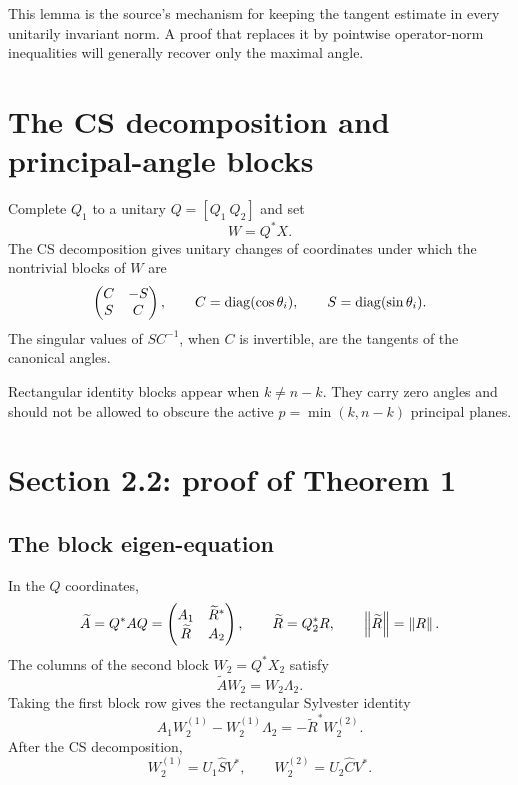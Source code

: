 This lemma is the source's mechanism for keeping the tangent estimate in every unitarily invariant norm. A proof that replaces it by pointwise operator-norm inequalities will generally recover only the maximal angle.

\section{The CS decomposition and principal-angle blocks}


Complete $Q_1$ to a unitary $Q=[Q_1\ Q_2]$ and set
\[
  W=Q^*X.
\]
The CS decomposition gives unitary changes of coordinates under which the nontrivial blocks of $W$ are
\[
  \begin{pmatrix}C&-S\\S&C\end{pmatrix},
  \qquad
  C=\operatorname{diag}(\cos\theta_i),
  \qquad
  S=\operatorname{diag}(\sin\theta_i).
\]
The singular values of $SC^{-1}$, when $C$ is invertible, are the tangents of the canonical angles.

Rectangular identity blocks appear when $k\ne n-k$. They carry zero angles and should not be allowed to obscure the active $p=\min(k,n-k)$ principal planes.

\section{Section 2.2: proof of Theorem 1}

\subsection{The block eigen-equation}

In the $Q$ coordinates,
\[
  \widetilde A=Q^*AQ
  =\begin{pmatrix}A_1&\widetilde R^*\\
                   \widetilde R&A_2\end{pmatrix},
  \qquad
  \widetilde R=Q_2^*R,
  \qquad
  \left\lVert \widetilde R\right\rVert=\left\lVert R\right\rVert.
\]
The columns of the second block $W_2=Q^*X_2$ satisfy
\[
  \widetilde A W_2=W_2\Lambda_2.
\]
Taking the first block row gives the rectangular Sylvester identity
\begin{equation}
  A_1W_2^{(1)}-W_2^{(1)}\Lambda_2
  =-\widetilde R^*W_2^{(2)}.
  \tag{N-8}\label{N-8}
\end{equation}
After the CS decomposition,
\[
  W_2^{(1)}=U_1\widehat S V^*,
  \qquad
  W_2^{(2)}=U_2\widehat C V^*.
\]

